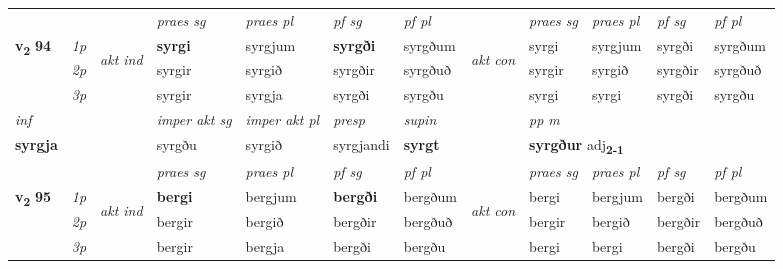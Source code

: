\begin{longtable}[l]{X>{\footnotesize\itshape}llXXXXlXXXX}
\midrule

 & &   & \textit{praes sg}  & \textit{praes pl}    & \textit{ pf sg} & \textit{pf pl} & & \textit{praes sg}  & \textit{praes pl}    & \textit{pf sg} & \textit{pf pl }  \\ \cmidrule{4-7} \cmidrule{9-12}
 \multirow{2}{*}{{{\textbf{v{\textsubscript{2}}} \Large{\textbf{94}}}}}  & 1p & \multirow{3}{*}{\begin{turn}{90}\textit{akt ind}\end{turn}} & \textbf{syrgi} & syrgjum & \textbf{syrgði} & syrgðum & \multirow{3}{*}{\begin{turn}{90}\textit{akt con}\end{turn}} &syrgi & syrgjum & syrgði & syrgðum\\*
 & 2p &  &  syrgir  & syrgið & syrgðir & syrgðuð & & syrgir & syrgið & syrgðir & syrgðuð \\*
 & 3p &  & syrgir & syrgja & syrgði & syrgðu & & syrgi & syrgi& syrgði & syrgðu \\*
\cmidrule{4-7} \cmidrule{9-12}

   {\textit{inf}} & &  & \textit{imper akt sg} & \textit{imper akt pl}   & \textit{presp} & \textit{supin}  && \textit{pp m} \\*
  {\textbf{syrgja}} & && syrgðu  & syrgið   & syrgjandi &  \textbf{syrgt}  && \multicolumn{2}{l}{\textbf{syrgður} adj\textbf{\textsubscript{2-1}}} \\*

\midrule

 & &   & \textit{praes sg}  & \textit{praes pl}    & \textit{ pf sg} & \textit{pf pl} & & \textit{praes sg}  & \textit{praes pl}    & \textit{pf sg} & \textit{pf pl }  \\ \cmidrule{4-7} \cmidrule{9-12}
 \multirow{2}{*}{{{\textbf{v{\textsubscript{2}}} \Large{\textbf{95}}}}}  & 1p & \multirow{3}{*}{\begin{turn}{90}\textit{akt ind}\end{turn}} & \textbf{bergi} & bergjum & \textbf{bergði} & bergðum & \multirow{3}{*}{\begin{turn}{90}\textit{akt con}\end{turn}} &bergi & bergjum & bergði & bergðum\\*
 & 2p &  &  bergir  & bergið & bergðir & bergðuð & & bergir & bergið & bergðir & bergðuð \\*
 & 3p &  & bergir & bergja & bergði & bergðu & & bergi & bergi& bergði & bergðu \\*
\cmidrule{4-7} \cmidrule{9-12}


\end{longtable}
